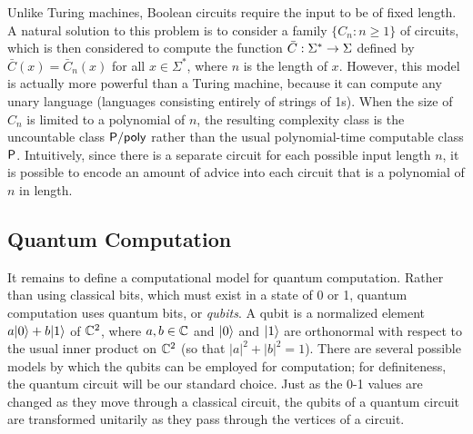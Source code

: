 Unlike Turing machines, Boolean circuits require the input to be of fixed 
length. A natural solution to this problem is to consider a family $\{C_n:n\geq 
1\}$ of circuits, which is then considered to compute  the function $\bar 
C:\Sigma^*\rightarrow\Sigma$ defined by $\bar C(x)=\bar C_n(x)$ for all $x\in\Sigma^*$, 
where $n$ is the length of $x$. However, this model is actually more powerful 
than a Turing machine, because it can compute any unary language (languages 
consisting entirely of strings of 1s). When the size of $C_n$ is limited to a 
polynomial of $n$, the resulting complexity class is the uncountable class 
$\mathsf{P}/\mathsf{poly}$ rather than the usual polynomial-time computable class $\mathsf{P}$. 
Intuitively, since there is a separate circuit for each possible input length 
$n$, it is possible to encode an amount of advice into each circuit that is a 
polynomial of $n$ in length.

\subsection{Quantum Computation}\label{quantum-model}

It remains to define a computational model for quantum computation. Rather than
using classical bits, which must exist in a state of 0 or 1, quantum computation
uses quantum bits, or \textit{qubits}. A qubit is a normalized element
$a|0\rangle+b|1\rangle$ of $\mathbb{C}^2$, where $a,b\in\mathbb{C}$ and $|0\rangle$ and $|1\rangle$ are
orthonormal with respect to the usual inner product on $\mathbb{C}^2$ (so that
$|a|^2+|b|^2=1$). There are several possible models by which the qubits can be
employed for computation; for definiteness, the quantum circuit will be our
standard choice. Just as the 0-1 values are changed as they move through a
classical circuit, the qubits of a quantum circuit are transformed unitarily as
they pass through the vertices of a circuit.

